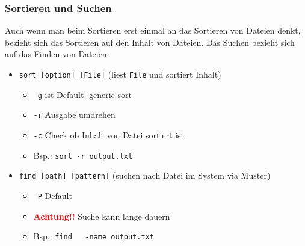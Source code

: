 \documentclass[12pt,utf8]{beamer}
\begin{document}
\begin{frame}
\frametitle{Sortieren und Suchen}
Auch wenn man beim Sortieren erst einmal an das Sortieren von Dateien denkt,
bezieht sich das Sortieren auf den Inhalt von Dateien.
Das Suchen bezieht sich auf das Finden von Dateien.
\begin{itemize}
	\item \texttt{sort [option] [File]} (liest \texttt{File} und sortiert Inhalt)
	\begin{itemize}[<+->]
		\item \texttt{-g} ist Default. generic sort
		\item \texttt{-r} Ausgabe umdrehen
		\item \texttt{-c} Check ob Inhalt von Datei sortiert ist
		\item Bsp.: \texttt{sort -r output.txt}
	\end{itemize}
	\item \texttt{find [path] [pattern]} (suchen nach Datei im System via Muster)
	\begin{itemize}[<+->]
		\item \texttt{-P} Default
		\item \textbf{\textcolor{red}{Achtung!!}} Suche kann lange dauern
		\item Bsp.: \texttt{find ~ -name output.txt}
	\end{itemize}
\end{itemize}
\end{frame}
\end{document}
